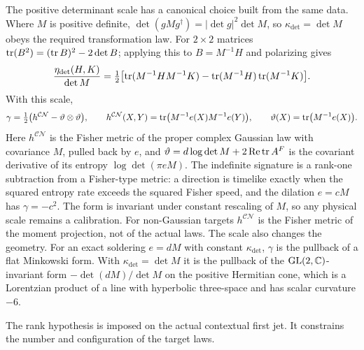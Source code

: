The positive determinant scale has a canonical choice built from the same data. Where $M$ is positive definite, $\det(gMg^\dagger)=|\det g|^2\det M$, so $\kappa_{\det}=\det M$ obeys the required transformation law. For $2\times2$ matrices $\operatorname{tr}(B^2)=(\operatorname{tr} B)^2-2\det B$; applying this to $B=M^{-1}H$ and polarizing gives
\begin{equation}
\frac{\eta_{\det}(H,K)}{\det M}
=\tfrac12\bigl[\operatorname{tr}(M^{-1}HM^{-1}K)-\operatorname{tr}(M^{-1}H)\operatorname{tr}(M^{-1}K)\bigr].
\end{equation}
With this scale,
\begin{equation}
\gamma=\tfrac12\bigl(h^{\mathcal{CN}}-\vartheta\otimes\vartheta\bigr),
\qquad
h^{\mathcal{CN}}(X,Y)=\operatorname{tr}\bigl(M^{-1}e(X)M^{-1}e(Y)\bigr),
\qquad
\vartheta(X)=\operatorname{tr}\bigl(M^{-1}e(X)\bigr).
\label{geo:det-canonical}
\end{equation}
Here $h^{\mathcal{CN}}$ is the Fisher metric of the proper complex Gaussian law with covariance $M$, pulled back by $e$, and $\vartheta=d\log\det M+2\operatorname{Re}\operatorname{tr} A^F$ is the covariant derivative of its entropy $\log\det(\pi eM)$. The indefinite signature is a rank-one subtraction from a Fisher-type metric: a direction is timelike exactly when the squared entropy rate exceeds the squared Fisher speed, and the dilation $e=cM$ has $\gamma=-c^2$. The form is invariant under constant rescaling of $M$, so any physical scale remains a calibration. For non-Gaussian targets $h^{\mathcal{CN}}$ is the Fisher metric of the moment projection, not of the actual laws. The scale also changes the geometry. For an exact soldering $e=dM$ with constant $\kappa_{\det}$, $\gamma$ is the pullback of a flat Minkowski form. With $\kappa_{\det}=\det M$ it is the pullback of the $\mathrm{GL}(2,\mathbb C)$-invariant form $-\det(dM)/\det M$ on the positive Hermitian cone, which is a Lorentzian product of a line with hyperbolic three-space and has scalar curvature $-6$.

The rank hypothesis is imposed on the actual contextual first jet. It constrains the number and configuration of the target laws.

